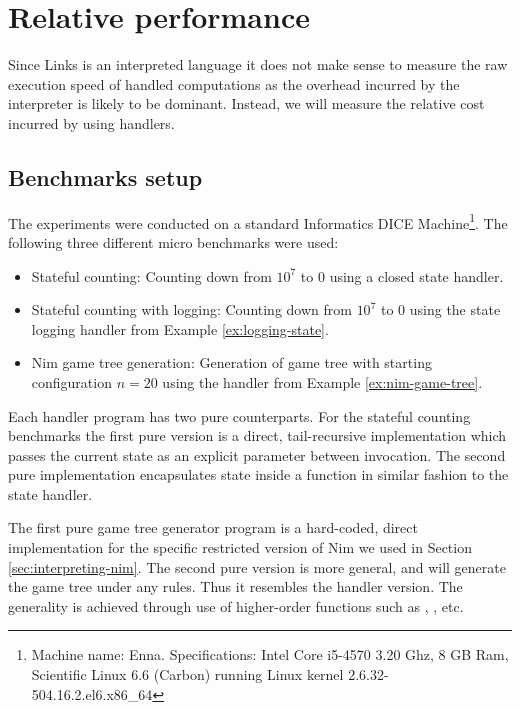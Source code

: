 \section{Relative performance}\label{sec:eval-performance}
Since Links is an interpreted language it does not make sense to measure the raw execution speed of handled computations as the overhead incurred by the interpreter is likely to be dominant. Instead, we will measure the relative cost incurred by using handlers.

\subsection{Benchmarks setup}
The experiments were conducted on a standard Informatics DICE Machine\footnote{Machine name: Enna. Specifications: Intel Core i5-4570 3.20 Ghz, 8 GB Ram, Scientific Linux 6.6 (Carbon) running Linux kernel 2.6.32-504.16.2.el6.x86\_64}. The following three different micro benchmarks were used:
\begin{itemize}
  \item Stateful counting: Counting down from $10^7$ to $0$ using a closed state handler.
  \item Stateful counting with logging: Counting down from $10^7$ to $0$ using the state logging handler from Example \ref{ex:logging-state}.
  \item Nim game tree generation: Generation of game tree with starting configuration $n = 20$ using the handler from Example \ref{ex:nim-game-tree}.
\end{itemize}
Each handler program has two pure counterparts. For the stateful counting benchmarks the first pure version is a direct, tail-recursive implementation which passes the current state as an explicit parameter between invocation. The second pure implementation encapsulates state inside a function in similar fashion to the state handler. 

The first pure game tree generator program is a hard-coded, direct implementation for the specific restricted version of Nim we used in Section \ref{sec:interpreting-nim}. The second pure version is more general, and will generate the game tree under any rules. Thus it resembles the handler version. The generality is achieved through use of higher-order functions such as , , etc.


